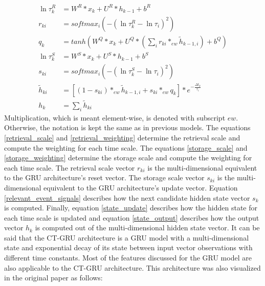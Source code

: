 \documentclass[draft,final]{vutinfth} %
\begin{document}
\begin{align}
\label{retrieval_scale}
\ln{\tau_k^R} &= W^R*x_k + U^R*h_{k-1} + b^R \\
\label{retrieval_weighting}
r_{ki} &= softmax_i(-(\ln{\tau_k^R-\ln{\tau_i}})^2) \\
\label{relevant_event_signals}
q_k &= tanh(W^Q*x_k + U^Q*(\sum_i {r_{ki} *_{ew} \tilde{h}_{k-1,i}}) + b^Q) \\
\label{storage_scale}
\ln{\tau_k^S} &= W^S*x_k + U^S*h_{k-1} + b^S \\
\label{storage_weighting}
s_{ki} &= softmax_i(-(\ln{\tau_k^S-\ln{\tau_i}})^2) \\
\label{state_update}
\tilde{h}_{ki} &= [(1 - s_{ki}) *_{ew} \tilde{h}_{k-1,i} + s_{ki} *_{ew} q_k] * e^{-\frac{\Delta t_k}{\tau_i}} \\
\label{state_output}
h_k &= \sum_i{\tilde{h}_{ki}}
\end{align}
Multiplication, which is meant element-wise, is denoted with subscript $ew$. Otherwise, the notation is kept the same as in previous models.
The equations \ref{retrieval_scale} and \ref{retrieval_weighting} determine the retrieval scale and compute the weighting for each time scale.
The equations \ref{storage_scale} and \ref{storage_weighting} determine the storage scale and compute the weighting for each time scale.
The retrieval scale vector $r_{ki}$ is the multi-dimensional equivalent to the GRU architecture's reset vector. The storage scale vector $s_{ki}$ is the multi-dimensional equivalent to the GRU architecture's update vector.
Equation \ref{relevant_event_signals} describes how the next candidate hidden state vector $s_k$ is computed.
Finally, equation \ref{state_update} describes how the hidden state for each time scale is updated and equation \ref{state_output} describes how the output vector $h_k$ is computed out of the multi-dimensional hidden state vector.
It can be said that the CT-GRU architecture is a GRU model with a multi-dimensional state and exponential decay of its state between input vector observations with different time constants.
Most of the features discussed for the GRU model are also applicable to the CT-GRU architecture.
This architecture was also visualized in the original paper as follows:
\end{document}
